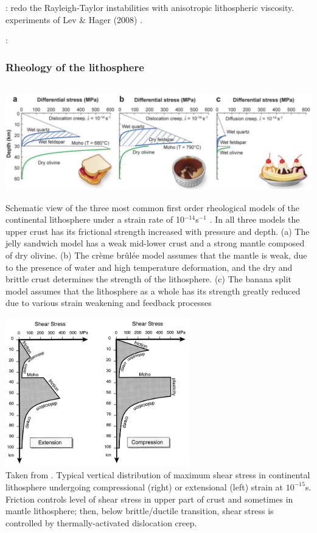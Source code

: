 \mscthesis{}: redo the Rayleigh-Taylor instabilities with anisotropic lithospheric viscosity.
experiments of Lev \& Hager (2008) \cite{leha08}. 

\Literature: \cite{mumh02,vatb98,mumc04,mumh02,mima04,rida78,saab84}

\subsubsection{Rheology of the lithosphere}


\begin{center}
\includegraphics[height=5cm]{images/rheology/budr08}\\
{\captionfont Schematic view of the three most common first order rheological models of the continental 
lithosphere under a strain rate of 10$^{-14}$s$^{-1}$ . 
In all three models the upper crust has its frictional strength increased with pressure and depth. 
(a) The jelly sandwich model has a weak mid-lower crust and a strong mantle composed of dry olivine. 
(b) The cr\`eme br\^ul\'ee model assumes that the mantle is weak, due to the presence of water and high 
temperature deformation, and the dry and brittle crust determines the strength of the lithosphere. 
(c) The banana split model assumes that the lithosphere as a whole has its strength greatly reduced
due to various strain weakening and feedback processes \cite{budr08}}
\end{center}

\begin{center}
\includegraphics[width=8cm]{images/rheology/bird99}\\
{\captionfont Taken from \cite{bird99}.
Typical vertical distribution of maximum shear stress in continental lithosphere 
undergoing compressional (right) or extensional (left) strain at $10^{-15}$s. 
Friction controls level of shear stress in upper part of crust and sometimes in mantle lithosphere;
then, below brittle/ductile transition, shear stress is controlled by thermally-activated dislocation creep.}
\end{center}

\Literature \cite{buwa06,budr08,rana97a,rana97b}





